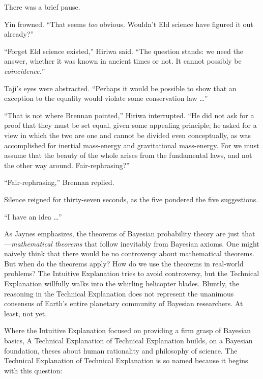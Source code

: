 {
 There was a brief pause.}

{
 Yin frowned. ``That seems \textit{too} obvious.
Wouldn't Eld science have figured it out
already?''}

{
 ``Forget Eld science existed,''
Hiriwa said. ``The question stands: we need the
answer, whether it was known in ancient times or not. It cannot
possibly be \textit{coincidence.}''}

{
 Taji's eyes were abstracted.
``Perhaps it would be possible to show that an
exception to the equality would violate some conservation law
\ldots''}

{
 ``That is not where Brennan
pointed,'' Hiriwa interrupted. ``He
did not ask for a proof that they must be set equal, given some
appealing principle; he asked for a view in which the two are one and
cannot be divided even conceptually, as was accomplished for inertial
mass-energy and gravitational mass-energy. For we must assume that the
beauty of the whole arises from the fundamental laws, and not the other
way around. Fair-rephrasing?''}

{
 ``Fair-rephrasing,'' Brennan
replied.}

{
 Silence reigned for thirty-seven seconds, as the five pondered the
five suggestions.}

{
 ``I have an idea \ldots''}

\myendsectiontext


{
 As Jaynes emphasizes, the theorems of Bayesian probability theory
are just that---\textit{mathematical theorems} that follow inevitably
from Bayesian axioms. One might naively think that
there would be no controversy about mathematical theorems. But when do
the theorems apply? How do we use the theorems in real-world problems?
The Intuitive Explanation tries to avoid controversy, but the Technical
Explanation willfully walks into the whirling helicopter blades.
Bluntly, the reasoning in the Technical Explanation does not represent
the unanimous consensus of Earth's entire planetary
community of Bayesian researchers. At least, not yet.}

{
 Where the Intuitive Explanation focused on providing a firm grasp
of Bayesian basics, A Technical Explanation of Technical Explanation
builds, on a Bayesian foundation, theses about human rationality and
philosophy of science. The Technical Explanation of Technical
Explanation is so named because it begins with this question:}

